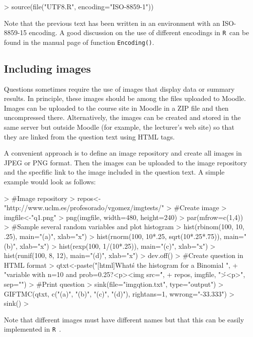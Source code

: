 \documentclass[a4paper]{article}
\newcommand{\RR}{\texttt{R}\ }
\newcommand{\code}[1]{\texttt{#1}}
\begin{document}

\begin{Schunk}
\begin{Sinput}
> source(file("UTF8.R", encoding="ISO-8859-1"))
\end{Sinput}
\end{Schunk}
\noindent
Note that the previous text has been written in an environment with an
ISO-8859-15 encoding. A good discussion on the use of different encodings
in \RR can be found in the manual page of function \code{Encoding()}.



\subsection{Including images}

Questions sometimes require the use of images that display data or summary
results. In principle, these images should be among the files uploaded to
Moodle.  Images can be uploaded to the course site in Moodle in a ZIP file and
then uncompressed there.  Alternatively, the images can be created and stored
in the same server but outside Moodle (for example, the lecturer's web site) so
that they are linked from the question text using HTML tags.

A convenient approach is to define an image repository and create all images in
JPEG or PNG format. Then the images can be uploaded to the image repository and
the specfific link to the image included in the question text. A simple example
would look as follows:

\begin{Schunk}
\begin{Sinput}
> #Image repository
> repos<-"http://www.uclm.es/profesorado/vgomez/imgtests/"
> #Create image
> imgfile<-"q1.png"
> png(imgfile, width=480, height=240)
> par(mfrow=c(1,4))
> #Sample several random variables and plot histogram
> hist(rbinom(100, 10, .25), main="(a)", xlab="x")
> hist(rnorm(100, 10*.25, sqrt(10*.25*.75)), main="(b)", xlab="x")
> hist(rexp(100, 1/(10*.25)), main="(c)", xlab="x")
> hist(runif(100, 8, 12), main="(d)", xlab="x")
> dev.off()
> #Create question in HTML format
> qtxt<-paste("[html]What\'s the histogram for a Binomial ",
+    "variable with n=10 and prob=0.25?\n<p>\n<img src=\'", 
+    repos, imgfile, "\'>\n<p>", sep="")
> #Print question
> sink(file="imgqtion.txt", type="output")
> GIFTMC(qtxt, c("(a)", "(b)", "(c)", "(d)"), rightans=1, wwrong="-33.333")
> sink()
> 
\end{Sinput}
\end{Schunk}
\noindent
Note that different images must have different names but that this can
be easily implemented in \RR.
\end{document}
